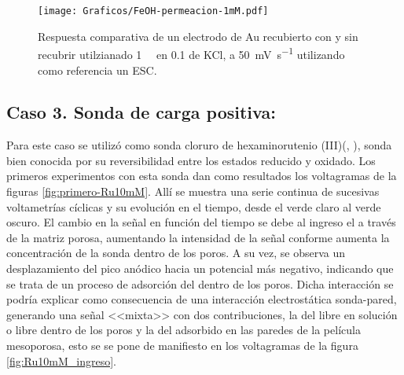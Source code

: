 		\begin{figure}[ht]
				\centering
		 	    \texttt{[image: Graficos/FeOH-permeacion-1mM.pdf]}
		        \caption[Permeación ferroceno metanol en \pdmF]{Respuesta comparativa de un electrodo de Au recubierto con \pdmF\space y sin recubrir utilzianado \fc\space \SI{1}{\milli\Molar} en \SI{0.1}{\Molar} de KCl, a \SI{50}{\milli\volt\per\second} utilizando como referencia un ESC.}
		        \label{fig:permeacion}
		      	\end{figure}

	\subsection{Caso 3. Sonda de carga positiva: \texorpdfstring{\aminorutenioCompleto}{aminorutenio}}

		Para este caso se utilizó como sonda cloruro de hexaminorutenio (III)\linebreak (\aminorutenioCompleto, \ru), sonda bien conocida por su reversibilidad entre los estados reducido y oxidado. Los primeros experimentos con esta sonda dan como resultados los voltagramas de la figuras \ref{fig:primero-Ru10mM}. Allí se muestra una serie continua de sucesivas voltametrías cíclicas y su evolución en el tiempo, desde el verde claro al verde oscuro. El cambio en la señal en función del tiempo se debe al ingreso el \ru\space a través de la matriz porosa, aumentando la intensidad de la señal conforme aumenta la concentración de la sonda dentro de los poros. A su vez, se observa un desplazamiento del pico anódico hacia un potencial más negativo, indicando que se trata de un proceso de adsorción del \ru\space dentro de los poros. Dicha interacción se podría explicar como consecuencia de una interacción electrostática sonda-pared, generando una señal <<mixta>> con dos contribuciones, la del \ru\space libre en solución o libre dentro de los poros y la del adsorbido en las paredes de la película mesoporosa, esto se se pone de manifiesto en los voltagramas de la figura \ref{fig:Ru10mM_ingreso}.

